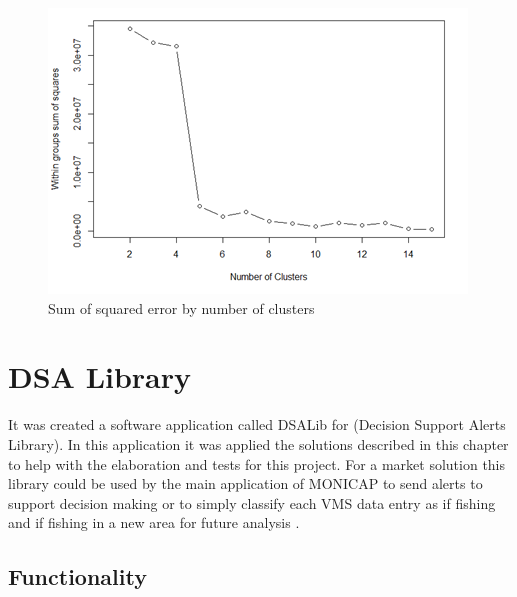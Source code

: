 \begin{figure}[H]
    \centering
    \includegraphics[width=0.8\linewidth]{Chapters/img/elbow_method.png}
    \caption{Sum of squared error by number of clusters}
    \label{fig:elbow_method}
\end{figure}






\section{DSA Library} %
\label{sub:dsa_library}


It was created a software application called DSALib for (Decision Support Alerts Library). In this application it was applied the solutions described in this chapter to help with the elaboration and tests for this project. For a market solution this library could be used by the main application of MONICAP to send alerts to support decision making or to simply classify each VMS data entry as if fishing and if fishing in a new area for future analysis .

\newpage


\subsection{Functionality} %
\label{sub:functionality}

